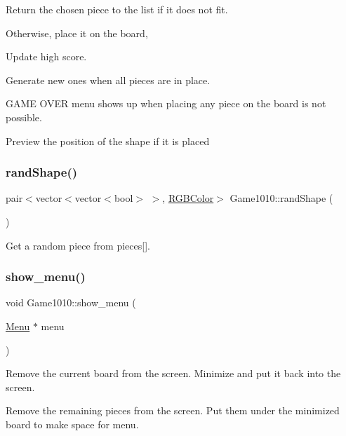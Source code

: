 Return the chosen piece to the list if it does not fit.

Otherwise, place it on the board,

Update high score.

Generate new ones when all pieces are in place.

G\+A\+ME O\+V\+ER menu shows up when placing any piece on the board is not possible.

Preview the position of the shape if it is placed \mbox{\label{class_game1010_a9b86f7bf4ad3af111014ad33a781ffe5}} 
\subsubsection{\texorpdfstring{rand\+Shape()}{randShape()}}
{\footnotesize\ttfamily pair$<$vector$<$vector$<$bool$>$ $>$, \mbox{\hyperlink{class_r_g_b_color}{R\+G\+B\+Color}}$>$ Game1010\+::rand\+Shape (\begin{DoxyParamCaption}{ }\end{DoxyParamCaption})\hspace{0.3cm}{\ttfamily [inline]}}



Get a random piece from pieces\mbox{[}\mbox{]}. 

\mbox{\label{class_game1010_a99d6f53c3073861fe37ef67caa073840}} 
\subsubsection{\texorpdfstring{show\+\_\+menu()}{show\_menu()}}
{\footnotesize\ttfamily void Game1010\+::show\+\_\+menu (\begin{DoxyParamCaption}\item[{\mbox{\hyperlink{class_menu}{Menu}} $\ast$}]{menu }\end{DoxyParamCaption})\hspace{0.3cm}{\ttfamily [inline]}}

Remove the current board from the screen. Minimize and put it back into the screen.

Remove the remaining pieces from the screen. Put them under the minimized board to make space for menu.

